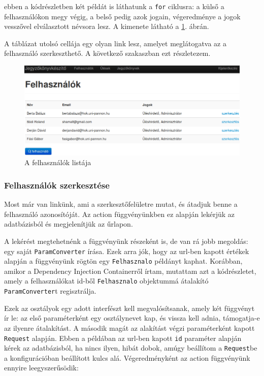 \documentclass[a4paper,12pt,oneside]{report}
\begin{document}
ebben a kódrészletben két példát is láthatunk a {\tt for} ciklusra: a külső a felhasználókon megy végig, a belső pedig azok jogain, végeredménye a jogok vesszővel elválasztott névsora lesz. A kimenete látható a \ref{fig:felhasznalo_lista}. ábrán.

A táblázat utolsó cellája egy olyan link lesz, amelyet meglátogatva az a felhasználó szerkeszthető. A következő szakaszban ezt részletezem.

\begin{figure}[h]
    \includegraphics[width=\textwidth]{felhasznalo_lista.png}
    \caption{A felhasználók listája}
    \label{fig:felhasznalo_lista}
\end{figure}

\subsubsection*{Felhasználók szerkesztése}

Most már van linkünk, ami a szerkesztőfelületre mutat, és átadjuk benne a felhasználó azonosítóját. Az action függvényünkben ez alapján lekérjük az adatbázisból és megjelenítjük az űrlapon.

A lekérést megtehetnénk a függvényünk részeként is, de van rá jobb megoldás: egy saját {\tt ParamConverter} írása. Ezek arra jók, hogy az url-ben kapott értékek alapján a függvényünk rögtön egy {\tt Felhasznalo} példányt kaphat. Korábban, amikor a Dependency Injection Containerről írtam, mutattam azt a kódrészletet, amely a felhasználókat id-ből {\tt Felhasznalo} objektummá átalakító {\tt ParamConverter}t regisztrálja.

Ezek az osztályok egy adott interfészt kell megvalósítsanak, amely két függvényt ír le: az első paraméterként egy osztálynevet kap, és vissza kell adnia, támogatja-e az ilyenre átalakítást. A második magát az alakítást végzi paraméterként kapott {\tt Request} alapján. Ebben a példában az url-ben kapott {\tt id} paraméter alapján kérek az adatbázisból, ha nincs ilyen, hibát dobok, amúgy beállítom a {\tt Request}be a konfigurációban beállított kulcs alá. Végeredményként az action függvényünk ennyire leegyszerűsödik:
\end{document}
